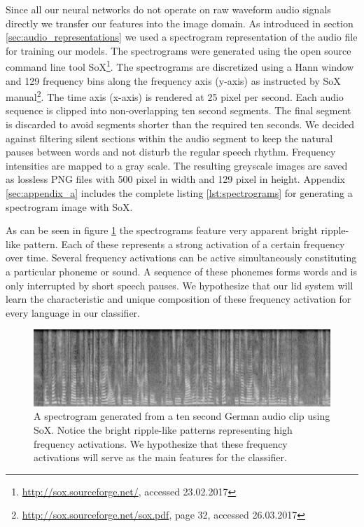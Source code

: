 	Since all our neural networks do not operate on raw waveform audio signals directly we transfer our features into the image domain. As introduced in section \ref{sec:audio_representations} we used a spectrogram representation of the audio file for training our models. The spectrograms were generated using the open source command line tool SoX\footnote{\url{http://sox.sourceforge.net/}, accessed 23.02.2017}. The spectrograms are discretized using a Hann window  and 129 frequency bins along the frequency axis (y-axis) as instructed by SoX manual\footnote{\url{http://sox.sourceforge.net/sox.pdf}, page 32, accessed 26.03.2017}. The time axis (x-axis) is rendered at 25 pixel per second. Each audio sequence is clipped into non-overlapping ten second segments. The  final segment is discarded to avoid segments shorter than the required ten seconds. We decided against filtering silent sections within the audio segment to keep the natural pauses between words and not disturb the regular speech rhythm. Frequency intensities are mapped to a gray scale. The resulting greyscale images are saved as lossless PNG files with 500 pixel in width and 129 pixel in height. Appendix \ref{sec:appendix_a} includes the complete listing \ref{lst:spectrograms} for generating a spectrogram image with SoX.
	
	As can be seen in figure \ref{fig:spectrogram} the spectrograms feature very apparent bright ripple-like pattern. Each of these represents a strong activation of a certain frequency over time. Several frequency activations can be active simultaneously constituting a particular phoneme or sound. A sequence of these phonemes forms words and is only interrupted by short speech pauses. We hypothesize that our \ac{lid} system will learn the characteristic and unique composition of these frequency activation for every language in our classifier. 

	
	\begin{figure}[]
  		\centering
    	\includegraphics[width=\textwidth,keepaspectratio]{img/spectrogram.png}
    	\caption{A spectrogram generated from a ten second German audio clip  using SoX. Notice the bright ripple-like patterns representing high frequency activations. We hypothesize that these frequency activations will serve as the main features for the classifier.}
    	\label{fig:spectrogram}
	\end{figure}
	

